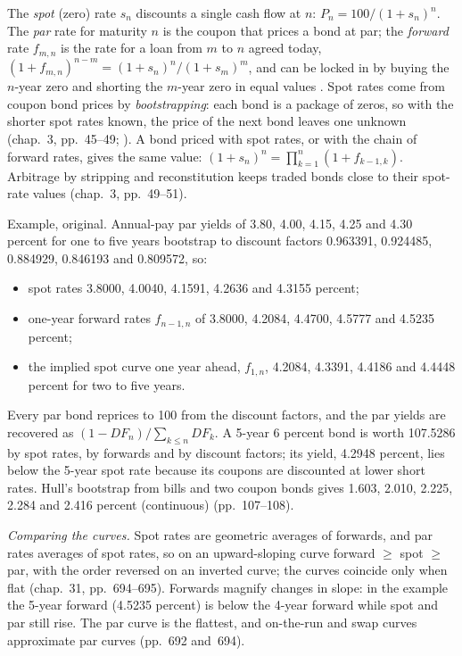 \begin{qfmethod}\label{meth:spot-par-forward-curves}
 The \emph{spot} (zero) rate $s_n$ discounts a single cash flow at $n$: $P_n=100/(1+s_n)^n$. The \emph{par} rate for maturity $n$ is the coupon that prices a bond at par; the \emph{forward} rate $f_{m,n}$ is the rate for a loan from $m$ to $n$ agreed today, $(1+f_{m,n})^{n-m}=(1+s_n)^n/(1+s_m)^m$, and can be locked in by buying the $n$-year zero and shorting the $m$-year zero in equal values \citep[chap.~31, pp.~692--693]{s7-fabozzifixed}. Spot rates come from coupon bond prices by \emph{bootstrapping}: each bond is a package of zeros, so with the shorter spot rates known, the price of the next bond leaves one unknown (chap.~3, pp.~45--49; \citep[sec.~4.7, pp.~106--108]{s7-hulloptions}). A bond priced with spot rates, or with the chain of forward rates, gives the same value: $(1+s_n)^n=\prod_{k=1}^n(1+f_{k-1,k})$. Arbitrage by stripping and reconstitution keeps traded bonds close to their spot-rate values (chap.~3, pp.~49--51).

 Example, original. Annual-pay par yields of 3.80, 4.00, 4.15, 4.25 and 4.30 percent for one to five years bootstrap to discount factors 0.963391, 0.924485, 0.884929, 0.846193 and 0.809572, so:
\begin{itemize}
\item spot rates 3.8000, 4.0040, 4.1591, 4.2636 and 4.3155 percent;
\item one-year forward rates $f_{n-1,n}$ of 3.8000, 4.2084, 4.4700, 4.5777 and 4.5235 percent;
\item the implied spot curve one year ahead, $f_{1,n}$, 4.2084, 4.3391, 4.4186 and 4.4448 percent for two to five years.
\end{itemize}
Every par bond reprices to 100 from the discount factors, and the par yields are recovered as $(1-DF_n)/\sum_{k\le n}DF_k$. A 5-year 6 percent bond is worth 107.5286 by spot rates, by forwards and by discount factors; its yield, 4.2948 percent, lies below the 5-year spot rate because its coupons are discounted at lower short rates. Hull's bootstrap from bills and two coupon bonds gives 1.603, 2.010, 2.225, 2.284 and 2.416 percent (continuous) (pp.~107--108).

 \emph{Comparing the curves.} Spot rates are geometric averages of forwards, and par rates averages of spot rates, so on an upward-sloping curve forward $\ge$ spot $\ge$ par, with the order reversed on an inverted curve; the curves coincide only when flat (chap.~31, pp.~694--695). Forwards magnify changes in slope: in the example the 5-year forward (4.5235 percent) is below the 4-year forward while spot and par still rise. The par curve is the flattest, and on-the-run and swap curves approximate par curves (pp.~692 and~694).


\end{qfmethod}
